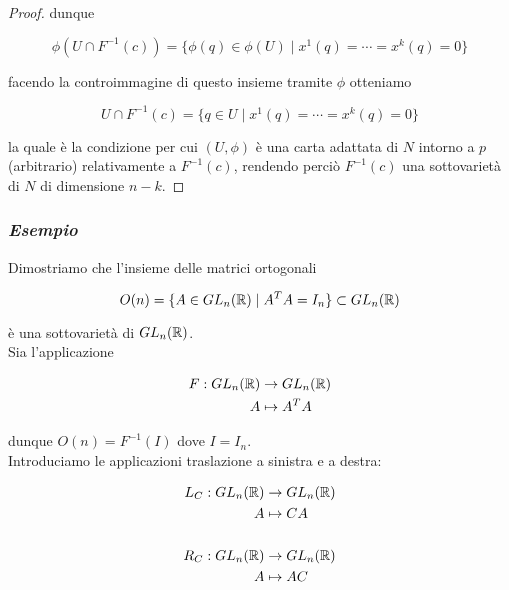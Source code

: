 \begin{proof}
	dunque
	
	\begin{equation}
		\phi( U \cap F^{-1}(c) ) = \{ \phi(q) \in \phi(U) \mid x^{1}(q) = \cdots = x^{k}(q) = 0 \}
	\end{equation}

	facendo la controimmagine di questo insieme tramite $ \phi $ otteniamo
	
	\begin{equation}
		U \cap F^{-1}(c) = \{ q \in U \mid x^{1}(q) = \cdots = x^{k}(q) = 0 \}
	\end{equation}

	la quale è la condizione per cui $ (U,\phi) $ è una carta adattata di $ N $ intorno a $ p $ (arbitrario) relativamente a $ F^{-1}(c) $, rendendo perciò $ F^{-1}(c) $ una sottovarietà di $ N $ di dimensione $ n-k $.
\end{proof}

\subsubsection{\textit{Esempio}}

Dimostriamo che l'insieme delle matrici ortogonali

\begin{equation}
	O(n) = \{ A \in GL_{n}(\mathbb{R}) \mid A^{T} A = I_{n} \} \subset GL_{n}(\mathbb{R})
\end{equation}

è una sottovarietà di $ GL_{n}(\mathbb{R}) $.\\
Sia l'applicazione

\begin{align}
	\begin{split}
		F : GL_{n}(\mathbb{R}) &\to GL_{n}(\mathbb{R})\\
		A &\mapsto A^{T} A
	\end{split}
\end{align}

dunque $ O(n) = F^{-1}(I) $ dove $ I = I_{n} $.\\
Introduciamo le applicazioni traslazione a sinistra e a destra:

\begin{align}
	\begin{split}
		L_{C} : GL_{n}(\mathbb{R}) &\to GL_{n}(\mathbb{R})\\
		A &\mapsto C A\\\\
		R_{C} : GL_{n}(\mathbb{R}) &\to GL_{n}(\mathbb{R})\\
		A &\mapsto A C
	\end{split}
\end{align}

